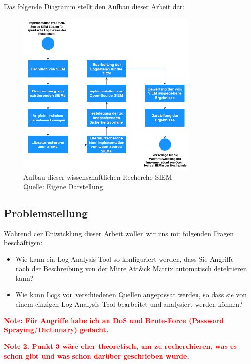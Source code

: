 Das folgende Diagramm stellt den Aufbau dieser Arbeit dar:


\begin{figure}[H]
   \centering
   \includegraphics[width=0.8\textwidth]{assets/1_p1.jpg}
   \caption{Aufbau dieser wissenschaftlichen Recherche \gls{SIEM} \\Quelle: Eigene Darstellung }
   \centering
\end{figure}

\subsection{Problemstellung}
Während der Entwicklung dieser Arbeit wollen wir uns mit folgenden Fragen beschäftigen:

\begin{itemize}
   \item Wie kann ein Log Analysis Tool so konfiguriert werden, dass Sie Angriffe nach der Beschreibung von der Mitre Att\&ck Matrix automatisch detektieren kann?
   \item Wie kann Logs von verschiedenen Quellen angepassat werden, so dass sie von einem einzigen Log Analysis Tool bearbeitet und analysiert werden können?
\end{itemize}

\textcolor{red}{\textbf{Note: Für Angriffe habe ich an DoS und Brute-Force (Password Spraying/Dictionary) gedacht.}}

\textcolor{red}{\textbf{Note 2: Punkt 3 wäre eher theoretisch, um zu recherchieren, was es schon gibt und was schon darüber geschrieben wurde.}}

